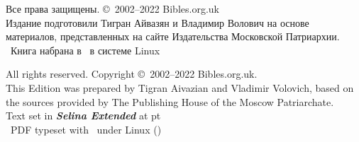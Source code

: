\begin{center}
\fontsize{9}{12}\selectfont
Все права защищены. \copyright\ 2002--2022 Bibles.org.uk\\
Издание подготовили Тигран Айвазян и Владимир Волович на основе материалов, представленных на сайте Издательства Московской Патриархии.\\
\tux\ Книга набрана в \XeLaTeX\ в системе Linux\\
\vspace*{1mm}

\copyrsepline

\vspace*{1mm}
All rights reserved. Copyright \copyright\ 2002--2022 Bibles.org.uk.\\
This Edition was prepared by Tigran Aivazian and Vladimir Volovich, based on the sources provided by The Publishing House of the Moscow Patriarchate.\\
Text set in \textbf{\itshape Selina Extended} at \bibmainfontsize pt\\
\tux\ PDF typeset with \XeLaTeX\ under Linux (\mytoday)\\
\end{center}
